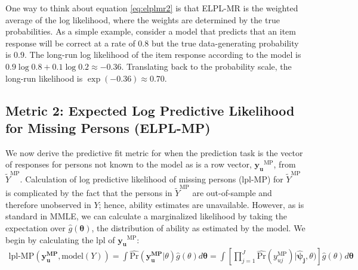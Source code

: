 \documentclass[
  english,
  man,floatsintext]{apa7}
\begin{document}
One way to think about equation \ref{eq:elplmr2} is that ELPL-MR is the weighted average of the log likelihood, where the weights are determined by the true probabilities. As a simple example, consider a model that predicts that an item response will be correct at a rate of \(0.8\) but the true data-generating probability is \(0.9\). The long-run log likelihood of the item response according to the model is \(0.9 \log 0.8 + 0.1 \log 0.2 \approx -0.36\). Translating back to the probability scale, the long-run likelihood is \(\exp(-0.36) \approx 0.70\).

\hypertarget{metric-2-expected-log-predictive-likelihood-for-missing-persons-elpl-mp}{%
\subsection{Metric 2: Expected Log Predictive Likelihood for Missing Persons (ELPL-MP)}\label{metric-2-expected-log-predictive-likelihood-for-missing-persons-elpl-mp}}

We now derive the predictive fit metric for when the prediction task is the vector of responses for persons not known to the model as is a row vector, \(\bm{y_u}^{\text{MP}}\), from \(\tilde Y^{\text{MP}}\). Calculation of log predictive likelihood of missing persons (lpl-MP) for \(\tilde Y^{\text{MP}}\) is complicated by the fact that the persons in \(\tilde Y^{\text{MP}}\) are out-of-sample and therefore unobserved in \(Y\); hence, ability estimates are unavailable. However, as is standard in MMLE, we can calculate a marginalized likelihood by taking the expectation over \(\hat g(\bm{\theta})\), the distribution of ability as estimated by the model. We begin by calculating the lpl of \(\bm{y_u}^{\text{MP}}\):
\begin{align}
\text{lpl-MP}(\bm{y_u^\text{MP}}, \text{model}(Y)) = \int \hat{\text{Pr}}(\bm{y_u^\text{MP}}|\theta) \hat g(\theta) d\bm{\theta} = \int \left[\prod_{j=1}^{J} \hat{\text{Pr}}(y_{uj}^\text{MP}) | \bm{\hat\psi_j}, \theta) \right] \hat g(\theta) d\bm{\theta}
\end{align}
\end{document}
